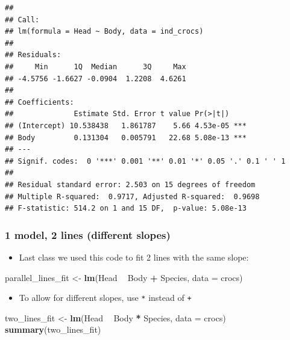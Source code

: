 \documentclass[]{article}
\newenvironment{Shaded}{\begin{snugshade}}{\end{snugshade}}
\newcommand{\KeywordTok}[1]{\textcolor[rgb]{0.13,0.29,0.53}{\textbf{#1}}}
\newcommand{\DataTypeTok}[1]{\textcolor[rgb]{0.13,0.29,0.53}{#1}}
\newcommand{\StringTok}[1]{\textcolor[rgb]{0.31,0.60,0.02}{#1}}
\newcommand{\OperatorTok}[1]{\textcolor[rgb]{0.81,0.36,0.00}{\textbf{#1}}}
\newcommand{\NormalTok}[1]{#1}
\providecommand{\tightlist}{%
  \setlength{\itemsep}{0pt}\setlength{\parskip}{0pt}}
\begin{document}
\begin{verbatim}
## 
## Call:
## lm(formula = Head ~ Body, data = ind_crocs)
## 
## Residuals:
##     Min      1Q  Median      3Q     Max 
## -4.5756 -1.6627 -0.0904  1.2208  4.6261 
## 
## Coefficients:
##              Estimate Std. Error t value Pr(>|t|)    
## (Intercept) 10.538438   1.861787    5.66 4.53e-05 ***
## Body         0.131304   0.005791   22.68 5.08e-13 ***
## ---
## Signif. codes:  0 '***' 0.001 '**' 0.01 '*' 0.05 '.' 0.1 ' ' 1
## 
## Residual standard error: 2.503 on 15 degrees of freedom
## Multiple R-squared:  0.9717, Adjusted R-squared:  0.9698 
## F-statistic: 514.2 on 1 and 15 DF,  p-value: 5.08e-13
\end{verbatim}

\newpage

\subsubsection{1 model, 2 lines (different
slopes)}\label{model-2-lines-different-slopes}

\begin{itemize}
\tightlist
\item
  Last class we used this code to fit 2 lines with the same slope:
\end{itemize}

\begin{Shaded}
\begin{Highlighting}[]
\NormalTok{parallel_lines_fit <-}\StringTok{ }\KeywordTok{lm}\NormalTok{(Head }\OperatorTok{~}\StringTok{ }\NormalTok{Body }\OperatorTok{+}\StringTok{ }\NormalTok{Species, }\DataTypeTok{data =}\NormalTok{ crocs)}
\end{Highlighting}
\end{Shaded}

\begin{itemize}
\tightlist
\item
  To allow for different slopes, use \texttt{*} instead of \texttt{+}
\end{itemize}

\begin{Shaded}
\begin{Highlighting}[]
\NormalTok{two_lines_fit <-}\StringTok{ }\KeywordTok{lm}\NormalTok{(Head }\OperatorTok{~}\StringTok{ }\NormalTok{Body }\OperatorTok{*}\StringTok{ }\NormalTok{Species, }\DataTypeTok{data =}\NormalTok{ crocs)}
\KeywordTok{summary}\NormalTok{(two_lines_fit)}
\end{Highlighting}
\end{Shaded}
\end{document}
